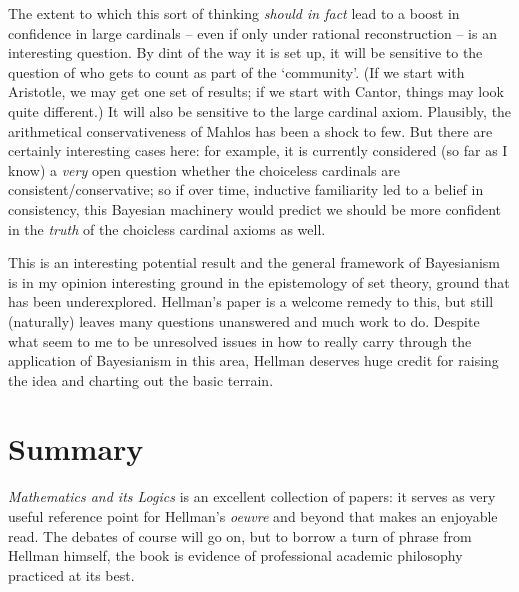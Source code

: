 \documentclass{amsart}
\theoremstyle{definition}
\begin{document}
The extent to which this sort of thinking \emph{should in fact} lead to a boost 
in confidence in large cardinals -- even if only under rational reconstruction --
is an interesting question. By dint of the way it is set up, it will be sensitive to 
the question of who gets to count as part of the `community'. (If we start with 
Aristotle, we may get one set of results; 
if we start with Cantor, things may look quite different.) It will also 
be sensitive to the large cardinal axiom. Plausibly, the arithmetical conservativeness of 
Mahlos has been a shock to few. But there are certainly 
interesting cases here: for example, it is currently considered (so far as I 
know) a \emph{very} open question whether the choiceless cardinals are consistent/conservative; 
so if over time, inductive familiarity led to a belief in consistency, this Bayesian 
machinery would predict we should be more confident in the \emph{truth} of the 
choicless cardinal axioms as well. 

This is an interesting potential result and the general framework of 
Bayesianism is in my opinion interesting ground in the epistemology of set theory,
ground that has been underexplored. Hellman's paper is a welcome remedy to this,
but still (naturally) leaves many questions unanswered and much work to do. Despite 
what seem to me to be unresolved issues in how to really carry through the application
of Bayesianism in this area, Hellman deserves huge credit for raising the idea 
and charting out the basic terrain.

\section*{Summary}
\emph{Mathematics and its Logics} is an excellent collection of papers: it serves 
as very useful reference point for Hellman's \emph{oeuvre} and beyond that 
makes an enjoyable read. The debates of course will go on, but to borrow 
a turn of phrase from Hellman himself, the book is evidence of professional academic
philosophy practiced at its best. 

%
\end{document}
